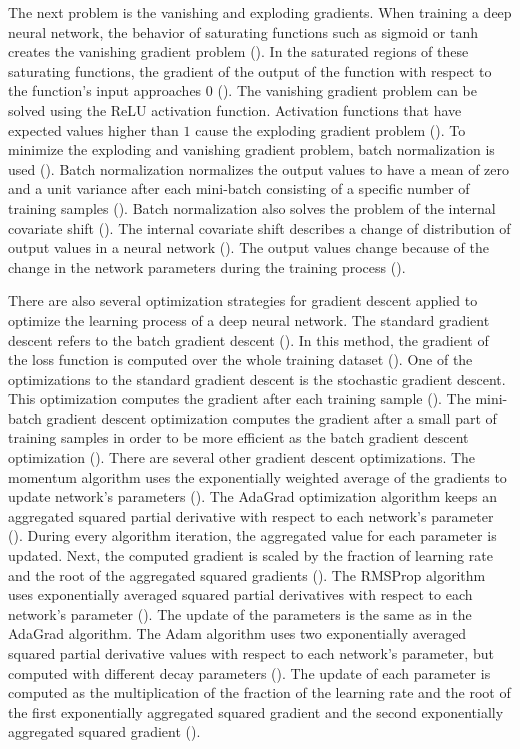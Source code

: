 \documentclass{BachelorBUI}
\begin{document}
                The next problem is the vanishing and exploding gradients. When training a deep neural network, the behavior of saturating functions such as sigmoid or tanh creates the vanishing gradient problem (\cite{Murphy:2022}). In the saturated regions of these saturating functions, the gradient of the output of the function with respect to the function's input approaches $0$ (\cite{Murphy:2022}). The vanishing gradient problem can be solved using the ReLU activation function. Activation functions that have expected values higher than $1$ cause the exploding gradient problem (\cite{Aggarwal:2018}). To minimize the exploding and vanishing gradient problem, batch normalization is used (\cite{Aggarwal:2018}). Batch normalization normalizes the output values to have a mean of zero and a unit variance after each mini-batch consisting of a specific number of training samples (\cite{Szegedy:2015:2}). Batch normalization also solves the problem of the internal covariate shift (\cite{Aggarwal:2018}). The internal covariate shift describes a change of distribution of output values in a neural network (\cite{Szegedy:2015:2}). The output values change because of the change in the network parameters during the training process (\cite{Szegedy:2015:2}).

                There are also several optimization strategies for gradient descent applied to optimize the learning process of a deep neural network. The standard gradient descent refers to the batch gradient descent (\cite{Li:2022}). In this method, the gradient of the loss function is computed over the whole training dataset (\cite{Gu:2018}). One of the optimizations to the standard gradient descent is the stochastic gradient descent. This optimization computes the gradient after each training sample (\cite{Li:2022}). The mini-batch gradient descent optimization computes the gradient after a small part of training samples in order to be more efficient as the batch gradient descent optimization (\cite{Li:2022}). There are several other gradient descent optimizations. The momentum algorithm uses the exponentially weighted average of the gradients to update network's parameters (\cite{Li:2022}). The AdaGrad optimization algorithm keeps an aggregated squared partial derivative with respect to each network's parameter (\cite{Aggarwal:2018}). During every algorithm iteration, the aggregated value for each parameter is updated. Next, the computed gradient is scaled by the fraction of learning rate and the root of the aggregated squared gradients (\cite{Aggarwal:2018}). The RMSProp algorithm uses exponentially averaged squared partial derivatives with respect to each network's parameter (\cite{Aggarwal:2018}). The update of the parameters is the same as in the AdaGrad algorithm. The Adam algorithm uses two exponentially averaged squared partial derivative values with respect to each network's parameter, but computed with different decay parameters (\cite{Aggarwal:2018}). The update of each parameter is computed as the multiplication of the fraction of the learning rate and the root of the first exponentially aggregated squared gradient and the second exponentially aggregated squared gradient (\cite{Aggarwal:2018}).
\end{document}
